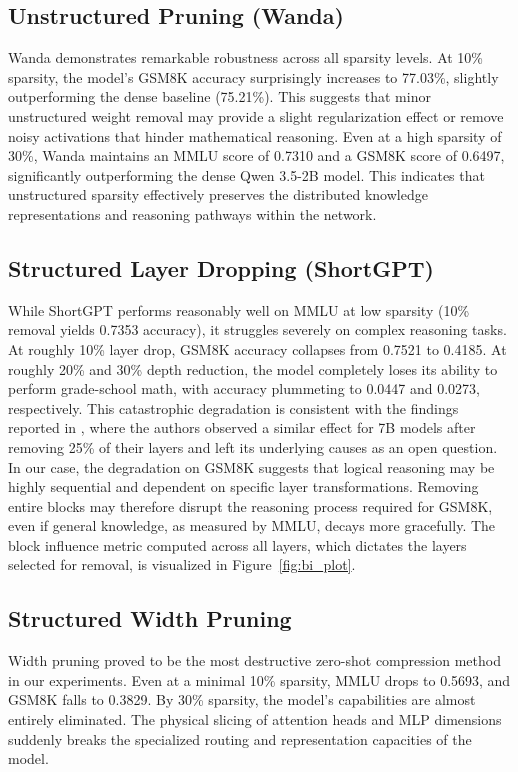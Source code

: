 \documentclass[11pt,a4paper,twocolumn]{article}
\begin{document}
\subsection{Unstructured Pruning (Wanda)}
Wanda demonstrates remarkable robustness across all sparsity levels. At 10\% sparsity, the model's GSM8K accuracy surprisingly increases to 77.03\%, slightly outperforming the dense baseline (75.21\%). This suggests that minor unstructured weight removal may provide a slight regularization effect or remove noisy activations that hinder mathematical reasoning. Even at a high sparsity of 30\%, Wanda maintains an MMLU score of 0.7310 and a GSM8K score of 0.6497, significantly outperforming the dense Qwen 3.5-2B model. This indicates that unstructured sparsity effectively preserves the distributed knowledge representations and reasoning pathways within the network.

\subsection{Structured Layer Dropping (ShortGPT)}
While ShortGPT performs reasonably well on MMLU at low sparsity (10\% removal yields 0.7353 accuracy), it struggles severely on complex reasoning tasks.
At roughly 10\% layer drop, GSM8K accuracy collapses from 0.7521 to 0.4185. At roughly 20\% and 30\% depth reduction, the model completely loses its ability to perform grade-school math,
with accuracy plummeting to 0.0447 and 0.0273, respectively.
This catastrophic degradation is consistent with the findings reported in \cite{men2024shortgpt}, where the authors observed a similar effect for 7B models after removing 25\% of their layers and left its underlying causes as an open question.
In our case, the degradation on GSM8K suggests that logical reasoning may be highly sequential and dependent on specific layer transformations.
Removing entire blocks may therefore disrupt the reasoning process required for GSM8K, even if general knowledge, as measured by MMLU, decays more gracefully. The block influence metric computed across all layers, which dictates the layers selected for removal, is visualized in Figure~\ref{fig:bi_plot}.

\subsection{Structured Width Pruning}
Width pruning proved to be the most destructive zero-shot compression method in our experiments. Even at a minimal 10\% sparsity, MMLU drops to 0.5693, and GSM8K falls to 0.3829.
By 30\% sparsity, the model's capabilities are almost entirely eliminated. The physical slicing of attention heads and MLP dimensions suddenly breaks the
specialized routing and representation capacities of the model. 
\end{document}
